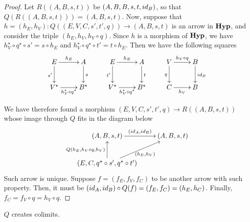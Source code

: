 \begin{proof}
	Let $R((A, B, s, t))$ be $(A, B, B, s, t, \id{B})$, so that $Q(R((A, B, s, t))) = (A, B, s, t)$. Now, suppose that $h = (h_E, h_V): Q((E, V, C, s', t', q)) \to (A, B, s, t)$  is an arrow in $\textbf{\textup{Hyp}}$, and consider the triple $(h_E, h_V, h_V \circ q)$. Since $h$ is a morphism of $\textbf{\textup{Hyp}}$, we have $h_V^{\star}\circ q^{\star}\circ s'= s\circ h_E$ and $h_V^{\star}\circ q^{\star}\circ t' = t\circ h_E$.
    Then we have the following squares
    \[\xymatrix{
		    E \ar[r]^{h_E}\ar[d]_{s'} & A \ar[d]^{s} & E \ar[r]^{h_E}\ar[d]_{t'} & A \ar[d]^{t} & V \ar[r]^{h_V \circ q} \ar[d]_{q} & B \ar[d]^{\id{B}} \\
		    V^{\star} \ar[r]_{h_V^\star\circ q^\star} & B^{\star} & V^{\star} \ar[r]_{h_V^\star\circ q^\star} & B^{\star} & C \ar[r]_{h_V} & B
    }\]

    \iffalse\[
        \begin{tikzcd}
            E \arrow[r, "{h_E}"] \arrow[d, "{s_G}"swap] & A \arrow[d, "s"] \\
            V \arrow[r, "{h_V \circ q}"swap] & B
        \end{tikzcd}
        \qquad
        \begin{tikzcd}
            E \arrow[r, "{h_E}"] \arrow[d, "{t_G}"swap] & A \arrow[d, "t"] \\
            V \arrow[r, "{h_V \circ q}"swap] & B
        \end{tikzcd}
        \qquad
        \begin{tikzcd}
            V \arrow[r, "{h_V\circ q}"] \arrow[d, "q" swap] & B \arrow[d, "{id_B}"] \\
            C \arrow[r, "{h_V}"swap] & B
        \end{tikzcd}
    \]\fi
    We have therefore found a morphism $(E, V, C, s', t', q) \to R((A, B, s, t))$ whose image through $Q$ fits in the diagram below
    \[\xymatrix{
		    (A, B, s, t) \ar[r]^{(\id{A}, \id{B})} & (A, B, s, t)\\
		    (E, C, q^\star\circ s', q^\star\circ t') \ar[u]^{Q(h_E, h_V \circ q, h_V)} \ar[ur]_{(h_E, h_V)}
    }\]   
    Such arrow is unique. Suppose $f = (f_E, f_V, f_C)$ to be another arrow with such property.
    Then, it must be $(\id A, \id B) \circ Q(f) = (f_E, f_C) = (h_E, h_C)$. Finally, $f_C = f_V \circ q = h_V \circ q$. 
\end{proof}

\begin{proposition}\label{prop:quot_creat_colims}
    $Q$ creates colimits.
\end{proposition}


